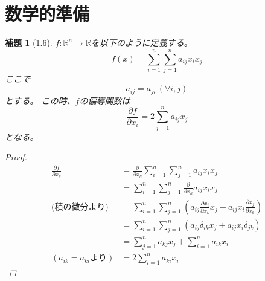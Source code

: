 \documentclass{book}
\newtheorem*{lemma}{補題}
\begin{document}
\section{数学的準備}
\begin{lemma}[1.6]
  $f: \mathbb{R}^n \rightarrow \mathbb{R} $を以下のように定義する。
  \[
    f(x) = \sum_{i = 1}^{n}\sum_{j = 1}^{n} a_{ij}x_ix_j
  \]
  ここで
  \[
    a_{ij} = a_{ji} \, (\forall i,j)
  \]
  とする。
  この時、$f$の偏導関数は
  \[
    \frac{\partial f}{\partial x_i} = 2\sum_{j = 1}^{n} a_{ij} x_j
  \]
  となる。
  \begin{proof}
    \begin{align*}
      \frac{\partial f}{\partial x_k} &= \frac{\partial}{\partial
      x_k}\sum_{i = 1}^{n}\sum_{j = 1}^{n} a_{ij}x_ix_j \\
      &= \sum_{i = 1}^{n}\sum_{j = 1}^{n} \frac{\partial}{\partial
      x_k}a_{ij}x_ix_j \\
      \text{(積の微分より)} &= \sum_{i = 1}^{n}\sum_{j = 1}^{n} \left(
        a_{ij}\frac{\partial x_i}{\partial x_k}x_j +
      a_{ij}x_i\frac{\partial x_j}{\partial x_k} \right) \\
      &= \sum_{i = 1}^{n}\sum_{j = 1}^{n} (a_{ij}\delta_{ik}x_j +
      a_{ij}x_i\delta_{jk}) \\
      &= \sum_{j = 1}^{n} a_{kj}x_j + \sum_{i = 1}^{n} a_{ik}x_i \\
      (a_{ik} = a_{ki}\text{より}) &= 2\sum_{i = 1}^{n} a_{ki}x_i
    \end{align*}
  \end{proof}
\end{lemma}
\end{document}
